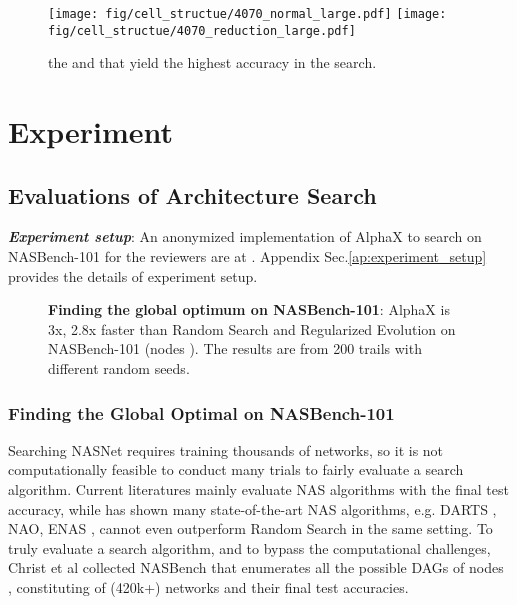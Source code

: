 \documentclass[10pt,twocolumn,letterpaper]{article}
\begin{document}
\begin{figure}
  \begin{center}
    \texttt{[image: fig/cell\_structue/4070\_normal\_large.pdf]}
    \texttt{[image: fig/cell\_structue/4070\_reduction\_large.pdf]}
  \end{center}
  \caption{the  and  that yield the highest accuracy in the search.}
  \label{best-arch}
\end{figure}

\section{Experiment}


\subsection{Evaluations of Architecture Search}
\textit{\textbf{Experiment setup}}:  An anonymized implementation of AlphaX to search on NASBench-101 for the reviewers are at \cite{alphax-implementation}. Appendix Sec.\ref{ap:experiment_setup} provides the details of experiment setup.

  \begin{figure}[t]
    \begin{center}
         \quad
    \end{center}
    \caption{\textbf{Finding the global optimum on NASBench-101}: AlphaX is 3x, 2.8x faster than Random Search and Regularized Evolution on NASBench-101 (nodes ). The results are from 200 trails with different random seeds. }
    \label{fig:nasbench-results}
  \end{figure}

\subsubsection{ Finding the Global Optimal on NASBench-101 }
Searching NASNet requires training thousands of networks, so it is not computationally feasible to conduct many trials to fairly evaluate a search algorithm. Current literatures mainly evaluate NAS algorithms with the final test accuracy, while \cite{sciuto2019evaluating} has shown many state-of-the-art NAS algorithms, e.g. DARTS \cite{liu2018darts}, NAO\cite{luo2018neural}, ENAS \cite{pham2018efficient}, cannot even outperform Random Search in the same setting. To truly evaluate a search algorithm, and to bypass the computational challenges, Christ et al collected NASBench \cite{ying2019bench} that enumerates all the possible DAGs of nodes , constituting of (420k+) networks and their final test accuracies.
\end{document}
